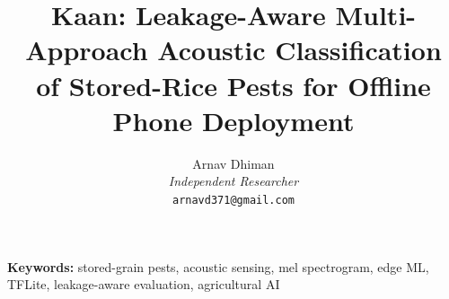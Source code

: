 \documentclass[11pt,a4paper]{article}
\title{Kaan: Leakage-Aware Multi-Approach Acoustic Classification\\
of Stored-Rice Pests for Offline Phone Deployment}
\author{Arnav Dhiman\\
\textit{Independent Researcher}\\
\texttt{arnavd371@gmail.com}}
\date{}
\begin{document}
\maketitle

\begin{abstract}
\noindent

\end{abstract}

\noindent\textbf{Keywords:} stored-grain pests, acoustic sensing, mel spectrogram, edge ML, TFLite, leakage-aware evaluation, agricultural AI

\tableofcontents
\newpage















\appendix




\end{document}
